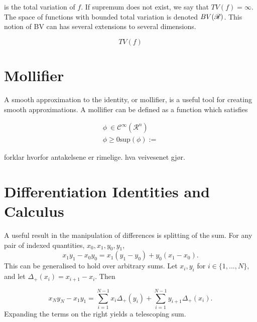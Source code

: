\begin{definition}
is the total variation of $f$. If supremum does not exist, we say that $TV(f) = \infty$. The space of functions with bounded total variation is denoted $BV(\mathscr{R})$. This notion of BV can has several extensions to several dimensions. 

\begin{equation}
TV(f)     
\end{equation}

\section{Mollifier}
A smooth approximation to the identity, or mollifier, is a useful tool for creating smooth approximations. A mollifier can be defined as a function which satisfies

\begin{align}
\phi \ \in \mathscr{C}^{\infty}(\mathscr{R}^n) \\
\phi \geq 0 
\text{sup}(\phi) := 
\end{align}

forklar hvorfor antakelsene er rimelige. hva veivesenet gjør.

\section{Differentiation Identities and Calculus}
A useful result in the manipulation of differences is splitting of the sum. For any pair of indexed quantities, $x_0, x_1,y_0, y_1$, 
\begin{equation} \label{disc_diff_part}
    x_1y_1 - x_0 y_0 = x_1 \left(y_1 - y_0\right) + y_0 \left(x_1 - x_0\right).
\end{equation}
This can be generalised to hold over arbitrary sums. Let $x_i, y_i$ for $i \in \{1,...,N\}$, and let $\Delta_+(x_i) = x_{i+1} - x_i$. Then 

\begin{equation} \label{discreteDiffPart}
    x_{N}y_{N} - x_{1}y_{1} = \sum_{i = 1}^{N-1} x_i \Delta_+(y_i) + \sum_{i = 1}^{N-1} y_{i+1}\Delta_+(x_i).
\end{equation}
Expanding the terms on the right yields a telescoping sum. 


\end{definition}
